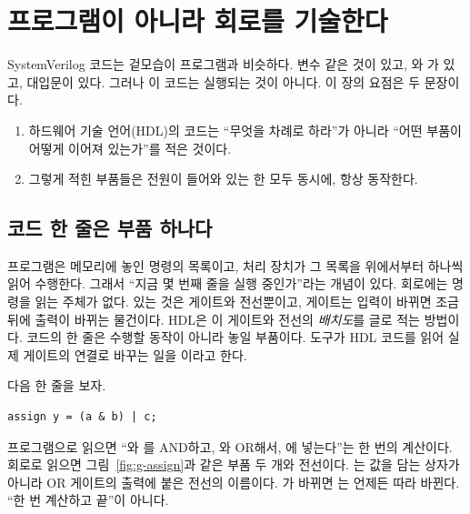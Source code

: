 \chapter{프로그램이 아니라 회로를 기술한다}\label{ch:hdl}

SystemVerilog 코드는 겉모습이 프로그램과 비슷하다. 변수 같은 것이 있고, 와 가 있고,
대입문이 있다. 그러나 이 코드는 실행되는 것이 아니다. 이 장의 요점은 두 문장이다.

\begin{keybox}
\begin{enumerate}
\item 하드웨어 기술 언어(HDL)의 코드는 ``무엇을 차례로 하라''가 아니라 ``어떤 부품이 어떻게 이어져
있는가''를 적은 것이다.
\item 그렇게 적힌 부품들은 전원이 들어와 있는 한 모두 동시에, 항상 동작한다.
\end{enumerate}
\end{keybox}

\section{코드 한 줄은 부품 하나다}

\Why 프로그램은 메모리에 놓인 명령의 목록이고, 처리 장치가 그 목록을 위에서부터 하나씩 읽어 수행한다.
그래서 ``지금 몇 번째 줄을 실행 중인가''라는 개념이 있다. 회로에는 명령을 읽는 주체가 없다. 있는 것은
게이트와 전선뿐이고, 게이트는 입력이 바뀌면 조금 뒤에 출력이 바뀌는 물건이다. HDL은 이 게이트와 전선의
\emph{배치도}를 글로 적는 방법이다. 코드의 한 줄은 수행할 동작이 아니라 놓일 부품이다.
도구가 HDL 코드를 읽어 실제 게이트의 연결로 바꾸는 일을 이라고 한다.

\General 다음 한 줄을 보자.

\begin{lstlisting}[language=SV,numbers=none]
assign y = (a & b) | c;
\end{lstlisting}

프로그램으로 읽으면 ``와 를 AND하고, 와 OR해서, 에 넣는다''는 한 번의
계산이다. 회로로 읽으면 그림~\ref{fig:g-assign}과 같은 부품 두 개와 전선이다. 는 값을 담는
상자가 아니라 OR 게이트의 출력에 붙은 전선의 이름이다. 가 바뀌면 는 언제든 따라 바뀐다.
``한 번 계산하고 끝''이 아니다.

